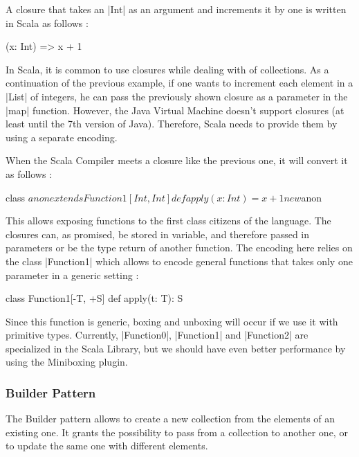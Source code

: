 A closure that takes an |Int| as an argument and increments it by one is written in Scala as follows :

\begin{lstlisting-nobreak}
 (x: Int) => x + 1
\end{lstlisting-nobreak}

In Scala, it is common to use closures while dealing with of collections. As a continuation of the previous example, if one wants to increment each element in a |List| of integers, he can pass the previously shown closure as a parameter in the |map| function. However, the Java Virtual Machine doesn't support closures (at least until the 7th version of Java). Therefore, Scala needs to provide them by using a separate encoding.

When the Scala Compiler meets a closure like the previous one, it will convert it as follows :

\begin{lstlisting-nobreak}
 {
  class $anon extends Function1[Int, Int] {
    def apply(x: Int) = x + 1
  }
  
  new $anon
 }
\end{lstlisting-nobreak}

This allows exposing functions to the first class citizens of the language. The closures can, as promised, be stored in variable, and therefore passed in parameters or be the type return of another function. The encoding here relies on the class |Function1| which allows to encode general functions that takes only one parameter in a generic setting :

\begin{lstlisting-nobreak}
 class Function1[-T, +S] {
   def apply(t: T): S
 }
\end{lstlisting-nobreak}

Since this function is generic, boxing and unboxing will occur if we use it with primitive types. Currently, |Function0|, |Function1| and |Function2| are specialized in the Scala Library, but we should have even better performance by using the Miniboxing plugin.

\subsubsection{Builder Pattern}

The Builder pattern allows to create a new collection from the elements of an existing one. It grants the possibility to pass from a collection to another one, or to update the same one with different elements.

